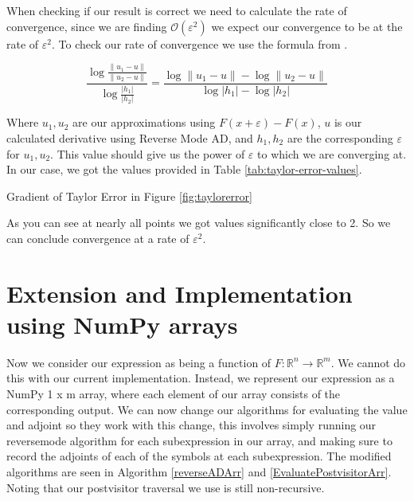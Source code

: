 \documentclass{article}
\begin{document}
When checking if our result is correct we need to calculate the rate of convergence, since we are finding $\mathcal{O}(\varepsilon^2)$ we expect our convergence to be at the rate of $\varepsilon^2$. To check our rate of convergence we use the formula from \cite{finite}.

\begin{equation} \label{taylort}
   \frac{\log{\frac{\|u_1 - u\|}{\|u_2 - u\|}}}{\log{\frac{|h_1|}{|h_2|}}} = \frac{\log\|u_1 - u\| - \log\|u_2 - u\|}{\log|h_1| - \log|h_2|}
\end{equation}

Where $u_1, u_2$ are our approximations using $F(x + \varepsilon) - F(x)$, $u$ is our calculated derivative using Reverse Mode AD, and $h_1, h_2$ are the corresponding $\varepsilon$ for $u_1, u_2$. This value should give us the power of $\varepsilon$ to which we are converging at. In our case, we got the values provided in Table \ref{tab:taylor-error-values}.

\begin{table}[h]
    \begin{center}
    \end{center}
    \caption{Gradient of Taylor Error in Figure \ref{fig:taylorerror}}
    \label{tab:taylor-error-values}
\end{table}


As you can see at nearly all points we got values significantly close to 2. So we can conclude convergence at a rate of $\varepsilon^2$.


\section{Extension and Implementation using NumPy arrays}

Now we consider our expression as being a function of $F: \mathbb{R}^n \longrightarrow \mathbb{R}^m$. We cannot do this with our current implementation. Instead, we represent our expression as a NumPy 1 x m array, where each element of our array consists of the corresponding output. We can now change our algorithms for evaluating the value and adjoint so they work with this change, this involves simply running our reversemode algorithm for each subexpression in our array, and making sure to record the adjoints of each of the symbols at each subexpression. The modified algorithms are seen in Algorithm \ref{reverseADArr} and \ref{EvaluatePostvisitorArr}. Noting that our postvisitor traversal we use is still non-recursive.
\end{document}
